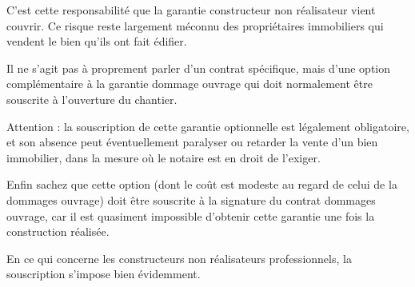 C'est cette responsabilité que la garantie constructeur non réalisateur vient couvrir. Ce risque reste largement méconnu des propriétaires immobiliers qui vendent le bien qu'ils ont fait édifier.

Il ne s'agit pas à proprement parler d'un contrat spécifique, mais d'une option complémentaire à la garantie dommage ouvrage qui doit normalement être souscrite à l'ouverture du chantier.

Attention : la souscription de cette garantie optionnelle est légalement obligatoire, et son absence peut éventuellement paralyser ou retarder la vente d'un bien immobilier, dans la mesure où le notaire est en droit de l'exiger.

Enfin sachez que cette option (dont le coût est modeste au regard de celui de la dommages ouvrage) doit être souscrite à la signature du contrat dommages ouvrage, car il est quasiment impossible d'obtenir cette garantie une fois la construction réalisée.

En ce qui concerne les constructeurs non réalisateurs professionnels, la souscription s'impose bien évidemment.
